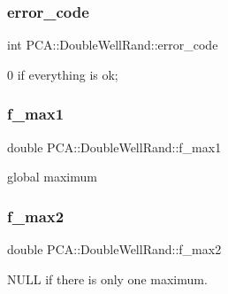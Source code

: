 \subsubsection{\texorpdfstring{error\+\_\+code}{error\_code}}
{\footnotesize\ttfamily int P\+C\+A\+::\+Double\+Well\+Rand\+::error\+\_\+code\hspace{0.3cm}{\ttfamily [private]}}



0 if everything is ok; 

\hypertarget{class_p_c_a_1_1_double_well_rand_a627173c860baf5c9744916fc9e203404}{}\label{class_p_c_a_1_1_double_well_rand_a627173c860baf5c9744916fc9e203404} 
\subsubsection{\texorpdfstring{f\+\_\+max1}{f\_max1}}
{\footnotesize\ttfamily double P\+C\+A\+::\+Double\+Well\+Rand\+::f\+\_\+max1\hspace{0.3cm}{\ttfamily [private]}}



global maximum 

\hypertarget{class_p_c_a_1_1_double_well_rand_a05278693e04d00a31bd41dedb38926b7}{}\label{class_p_c_a_1_1_double_well_rand_a05278693e04d00a31bd41dedb38926b7} 
\subsubsection{\texorpdfstring{f\+\_\+max2}{f\_max2}}
{\footnotesize\ttfamily double P\+C\+A\+::\+Double\+Well\+Rand\+::f\+\_\+max2\hspace{0.3cm}{\ttfamily [private]}}



N\+U\+LL if there is only one maximum. 

\hypertarget{class_p_c_a_1_1_double_well_rand_a5fa2e0c609851d3e8a8cb9eb4bbd90c6}{}\label{class_p_c_a_1_1_double_well_rand_a5fa2e0c609851d3e8a8cb9eb4bbd90c6} 

